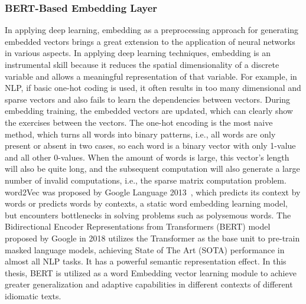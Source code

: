 \subsubsection{BERT-Based Embedding Layer}

In applying deep learning, embedding as a preprocessing approach for generating embedded vectors brings a great extension to the application of neural networks in various aspects.  In applying deep learning techniques, embedding is an instrumental skill because it reduces the spatial dimensionality of a discrete variable and allows a meaningful representation of that variable. For example, in NLP, if basic one-hot coding is used, it often results in too many dimensional and sparse vectors and also fails to learn the dependencies between vectors. During embedding training, the embedded vectors are updated, which can clearly show the exercises between the vectors. The one-hot encoding is the most naive method, which turns all words into binary patterns, i.e., all words are only present or absent in two cases, so each word is a binary vector with only 1-value and all other 0-values. When the amount of words is large, this vector's length will also be quite long, and the subsequent computation will also generate a large number of invalid computations, i.e., the sparse matrix computation problem. word2Vec was proposed by Google Language 2013~\cite{church2017word2vec}, which predicts its context by words or predicts words by contexts, a static word embedding learning model, but encounters bottlenecks in solving problems such as polysemous words. The Bidirectional Encoder Representations from Transformers (BERT) model proposed by Google in 2018 utilizes the Transformer as the base unit to pre-train masked language models, achieving State of The Art (SOTA) performance in almost all NLP tasks. It has a powerful semantic representation effect. In this thesis, BERT is utilized as a word Embedding vector learning module to achieve greater generalization and adaptive capabilities in different contexts of different idiomatic texts.

